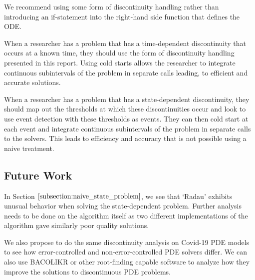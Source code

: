 We recommend using some form of discontinuity handling rather than introducing an if-statement into the right-hand side function that defines the ODE.

When a researcher has a problem that has a time-dependent discontinuity that occurs at a known time, they should use the form of discontinuity handling presented in this report. Using cold starts allows the researcher to integrate continuous subintervals of the problem in separate calls leading, to efficient and accurate solutions.

When a researcher has a problem that has a state-dependent discontinuity, they should map out the thresholds at which these discontinuities occur and look to use event detection with these thresholds as events. They can then cold start at each event and integrate continuous subintervals of the problem in separate calls to the solvers. This leads to efficiency and accuracy that is not possible using a naive treatment. 

\subsection{Future Work}
\label{subsection:future_work}
In Section $\ref{subsection:naive_state_problem}$, we see that `Radau' exhibits unusual behavior when solving the state-dependent problem. Further analysis needs to be done on the algorithm itself as two different implementations of the algorithm gave similarly poor quality solutions.

We also propose to do the same discontinuity analysis on Covid-19 PDE models to see how error-controlled and non-error-controlled PDE solvers differ. We can also use BACOLIKR or other root-finding capable software to analyze how they improve the solutions to discontinuous PDE problems.

